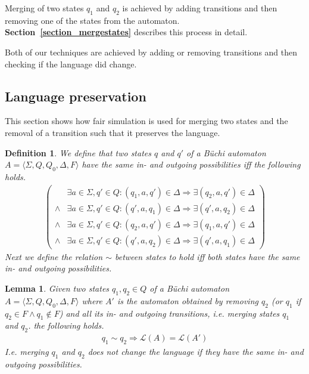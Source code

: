\documentclass[12pt,oneside,bibliography=totoc,abstracton]{scrartcl}
\newcommand{\sectionref}[1]{\textbf{Section~\ref{#1}}}
\newtheorem{mydef}{Definition}
\newtheorem{mylemma}{Lemma}
\begin{document}
Merging of two states $q_1$ and $q_2$ is achieved by adding transitions and then removing one of the states from the automaton.
\sectionref{section_mergestates} describes this process in detail.

Both of our techniques are achieved by adding or removing transitions and
then checking if the language did change.
 
\subsection{Language preservation}
This section shows how fair simulation is used for merging two states
and the removal of a transition such that it preserves the language.
\begin{mydef}\label{def_inoutpossibilities}
	We define that two states $q$ and $q'$ of a Büchi automaton $A = \langle\Sigma, Q , Q_0, \Delta, F\rangle$
	have the same \textnormal{in- and outgoing possibilities} iff the following holds.
	\begin{align*}
		\begin{pmatrix}
				&\exists a \in \Sigma, q' \in Q : (q_1, a, q') \in \Delta \Rightarrow \exists (q_2, a, q') \in \Delta\\
			\land	&\exists a \in \Sigma, q' \in Q : (q', a, q_1) \in \Delta \Rightarrow \exists (q', a, q_2) \in \Delta\\
			\land	&\exists a \in \Sigma, q' \in Q : (q_2, a, q') \in \Delta \Rightarrow \exists (q_1, a, q') \in \Delta\\
			\land	&\exists a \in \Sigma, q' \in Q : (q', a, q_2) \in \Delta \Rightarrow \exists (q', a, q_1) \in \Delta
		\end{pmatrix}
	\end{align*}
	Next we define the relation $\sim$ between states to hold iff both states have the
	same \textnormal{in- and outgoing possibilities}.
\end{mydef}
\begin{mylemma}\label{lemma_safemerge}
	Given two states $q_1, q_2 \in Q$ of a Büchi automaton $A = \langle\Sigma, Q , Q_0, \Delta, F\rangle$ where
	$A'$ is the automaton obtained by removing $q_2$ (or $q_1$ if $q_2 \in F \land q_1 \notin F$) and all
	its in- and outgoing transitions, i.e. merging states $q_1$ and $q_2$. the following holds.
	\begin{align*}
		q_1 \sim q_2 \Rightarrow \mathcal{L}(A) = \mathcal{L}(A')
	\end{align*}
	I.e. merging $q_1$ and $q_2$ does not change the language if they have the same in- and outgoing possibilities.
\end{mylemma}
\end{document}
